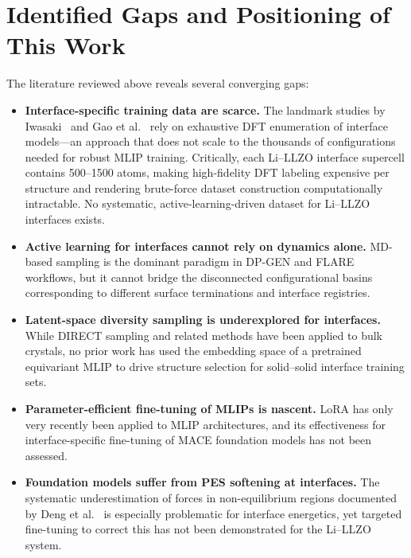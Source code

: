 \documentclass[12pt,a4paper,oneside]{book}
\begin{document}
\section{Identified Gaps and Positioning of This Work}
\label{sec:gaps}

The literature reviewed above reveals several converging gaps:

\begin{itemize}
  \item \textbf{Interface-specific training data are scarce.} The landmark studies by Iwasaki~\cite{Iwasaki2022} and Gao et al.~\cite{Gao2020} rely on exhaustive DFT enumeration of interface models---an approach that does not scale to the thousands of configurations needed for robust MLIP training. Critically, each Li--LLZO interface supercell contains 500--1500 atoms, making high-fidelity DFT labeling expensive per structure and rendering brute-force dataset construction computationally intractable. No systematic, active-learning-driven dataset for Li--LLZO interfaces exists.
  \item \textbf{Active learning for interfaces cannot rely on dynamics alone.} MD-based sampling is the dominant paradigm in DP-GEN and FLARE workflows, but it cannot bridge the disconnected configurational basins corresponding to different surface terminations and interface registries.
  \item \textbf{Latent-space diversity sampling is underexplored for interfaces.} While DIRECT sampling and related methods have been applied to bulk crystals, no prior work has used the embedding space of a pretrained equivariant MLIP to drive structure selection for solid--solid interface training sets.
  \item \textbf{Parameter-efficient fine-tuning of MLIPs is nascent.} LoRA has only very recently been applied to MLIP architectures, and its effectiveness for interface-specific fine-tuning of MACE foundation models has not been assessed.
  \item \textbf{Foundation models suffer from PES softening at interfaces.} The systematic underestimation of forces in non-equilibrium regions documented by Deng et al.~\cite{Deng2025} is especially problematic for interface energetics, yet targeted fine-tuning to correct this has not been demonstrated for the Li--LLZO system.
\end{itemize}
\end{document}
